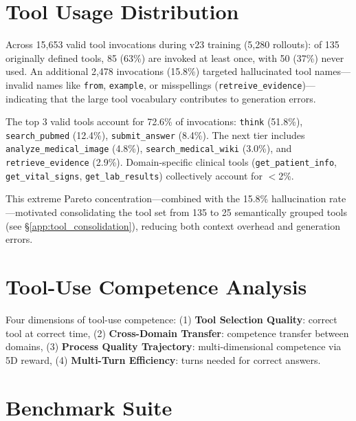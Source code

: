 \documentclass{article}
\begin{document}
\section{Tool Usage Distribution}
\label{app:tool_distribution}

Across 15,653 valid tool invocations during v23 training (5,280 rollouts): of 135 originally defined tools, 85 (63\%) are invoked at least once, with 50 (37\%) never used. An additional 2,478 invocations (15.8\%) targeted hallucinated tool names---invalid names like \texttt{from}, \texttt{example}, or misspellings (\texttt{retreive\_evidence})---indicating that the large tool vocabulary contributes to generation errors.

The top 3 valid tools account for 72.6\% of invocations: \texttt{think} (51.8\%), \texttt{search\_pubmed} (12.4\%), \texttt{submit\_answer} (8.4\%). The next tier includes \texttt{analyze\_medical\_image} (4.8\%), \texttt{search\_medical\_wiki} (3.0\%), and \texttt{retrieve\_evidence} (2.9\%). Domain-specific clinical tools (\texttt{get\_patient\_info}, \texttt{get\_vital\_signs}, \texttt{get\_lab\_results}) collectively account for $<$2\%.

This extreme Pareto concentration---combined with the 15.8\% hallucination rate---motivated consolidating the tool set from 135 to 25 semantically grouped tools (see \S\ref{app:tool_consolidation}), reducing both context overhead and generation errors.


\section{Tool-Use Competence Analysis}
\label{app:tool_competence}

Four dimensions of tool-use competence: (1) \textbf{Tool Selection Quality}: correct tool at correct time, (2) \textbf{Cross-Domain Transfer}: competence transfer between domains, (3) \textbf{Process Quality Trajectory}: multi-dimensional competence via 5D reward, (4) \textbf{Multi-Turn Efficiency}: turns needed for correct answers.


\section{Benchmark Suite}
\label{app:benchmarks}
\end{document}
